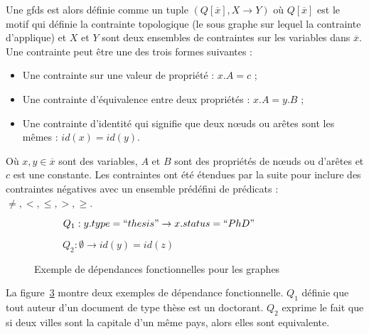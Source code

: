 Une \glspl{gfd} est alors définie comme un tuple $(Q[\overline{x}], X \to Y)$ où $Q[\overline{x}]$ est le motif qui définie la contrainte topologique (le sous graphe sur lequel la contrainte d'applique) et $X$ et $Y$ sont deux ensembles de contraintes sur les variables dans $\overline{x}$.
Une contrainte peut être une des trois formes suivantes :
\begin{itemize}
    \item Une contrainte sur une valeur de propriété : $x.A = c$ ;
    \item Une contrainte d'équivalence entre deux propriétés : $x.A = y.B$ ;
    \item Une contrainte d'identité qui signifie que deux nœuds ou arêtes sont les mêmes : $id(x) = id(y)$.
\end{itemize}
Où $x, y \in \overline{x}$ sont des variables, $A$ et $B$ sont des propriétés de nœuds ou d'arêtes et $c$ est une constante.
Les contraintes ont été étendues par la suite pour inclure des contraintes négatives avec un ensemble prédéfini de prédicats : $\neq, <, \le, >, \ge$.

\begin{figure}[ht]
    \centering
    \begin{subfigure}[b]{.45\textwidth}
        \centering
        \caption*{$Q_1 : y.type = ``thesis" \to x.status = ``PhD"$}
        \label{fig:gfd:q1}
    \end{subfigure}
    \hfill
    \begin{subfigure}[b]{.45\textwidth}
        \centering
        \caption*{$Q_2: \emptyset \to id(y) = id(z)$}
        \label{fig:gfd:q2}
    \end{subfigure}
    \caption{Exemple de dépendances fonctionnelles pour les graphes}
    \label{fig:gfd}
\end{figure}

\begin{example}
    La figure~\ref{fig:gfd} montre deux exemples de dépendance fonctionnelle.
    $Q_1$ définie que tout auteur d'un document de type thèse est un doctorant.
    $Q_2$ exprime le fait que si deux villes sont la capitale d'un même pays, alors elles sont equivalente.
\end{example}
